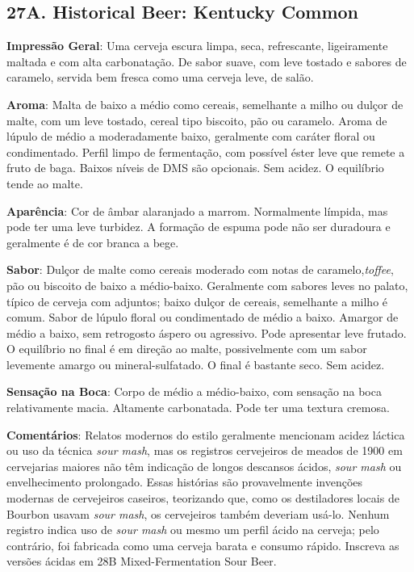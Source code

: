 \subsection*{27A. Historical Beer: Kentucky Common}
\textbf{Impressão Geral}: Uma cerveja escura limpa, seca, refrescante, ligeiramente maltada e com alta carbonatação. De sabor suave, com leve tostado e sabores de caramelo, servida bem fresca como uma cerveja leve, de salão.

\textbf{Aroma}: Malta de baixo a médio como cereais, semelhante a milho ou dulçor de malte, com um leve tostado, cereal tipo biscoito, pão ou caramelo. Aroma de lúpulo de médio a moderadamente baixo, geralmente com caráter floral ou condimentado. Perfil limpo de fermentação, com possível éster leve que remete a fruto de baga. Baixos níveis de DMS são opcionais. Sem acidez. O equilíbrio tende ao malte.

\textbf{Aparência}: Cor de âmbar alaranjado a marrom. Normalmente límpida, mas pode ter uma leve turbidez. A formação de espuma pode não ser duradoura e geralmente é de cor branca a bege.

\textbf{Sabor}: Dulçor de malte como cereais moderado com notas de caramelo,\textit{toffee}, pão ou biscoito de baixo a médio-baixo. Geralmente com sabores leves no palato, típico de cerveja com adjuntos; baixo dulçor de cereais, semelhante a milho é comum. Sabor de lúpulo floral ou condimentado de médio a baixo. Amargor de médio a baixo, sem retrogosto áspero ou agressivo. Pode apresentar leve frutado. O equilíbrio no final é em direção ao malte, possivelmente com um sabor levemente amargo ou mineral-sulfatado. O final é bastante seco. Sem acidez.

\textbf{Sensação na Boca}: Corpo de médio a médio-baixo, com sensação na boca relativamente macia. Altamente carbonatada. Pode ter uma textura cremosa.

\textbf{Comentários}: Relatos modernos do estilo geralmente mencionam acidez láctica ou uso da técnica \textit{sour mash}, mas os registros cervejeiros de meados de 1900 em cervejarias maiores não têm indicação de longos descansos ácidos, \textit{sour mash} ou envelhecimento prolongado. Essas histórias são provavelmente invenções modernas de cervejeiros caseiros, teorizando que, como os destiladores locais de Bourbon usavam \textit{sour mash}, os cervejeiros também deveriam usá-lo. Nenhum registro indica uso de \textit{sour mash} ou mesmo um perfil ácido na cerveja; pelo contrário, foi fabricada como uma cerveja barata e consumo rápido. Inscreva as versões ácidas em 28B Mixed-Fermentation Sour Beer.

